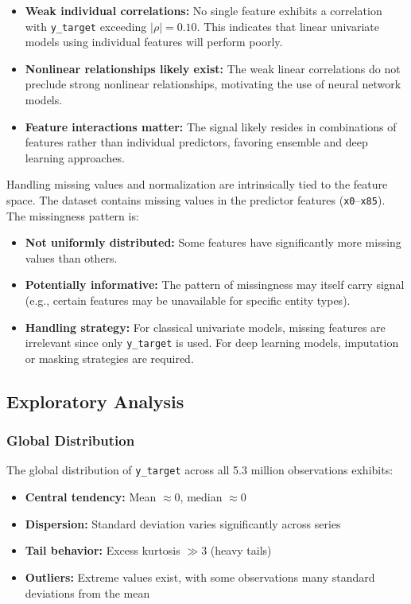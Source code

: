 \begin{itemize}
    \item \textbf{Weak individual correlations:} No single feature exhibits a correlation with \texttt{y\_target} exceeding $|\rho| = 0.10$. This indicates that linear univariate models using individual features will perform poorly.
    \item \textbf{Nonlinear relationships likely exist:} The weak linear correlations do not preclude strong nonlinear relationships, motivating the use of neural network models.
    \item \textbf{Feature interactions matter:} The signal likely resides in combinations of features rather than individual predictors, favoring ensemble and deep learning approaches.
\end{itemize}
Handling missing values and normalization are intrinsically tied to the feature space. The dataset contains missing values in the predictor features (\texttt{x0}--\texttt{x85}). The missingness pattern is:

\begin{itemize}
    \item \textbf{Not uniformly distributed:} Some features have significantly more missing values than others.
    \item \textbf{Potentially informative:} The pattern of missingness may itself carry signal (e.g., certain features may be unavailable for specific entity types).
    \item \textbf{Handling strategy:} For classical univariate models, missing features are irrelevant since only \texttt{y\_target} is used. For deep learning models, imputation or masking strategies are required.
\end{itemize}

\subsection{Exploratory Analysis}
\subsubsection{Global Distribution}

The global distribution of \texttt{y\_target} across all 5.3 million observations exhibits:

\begin{itemize}
    \item \textbf{Central tendency:} Mean $\approx 0$, median $\approx 0$
    \item \textbf{Dispersion:} Standard deviation varies significantly across series
    \item \textbf{Tail behavior:} Excess kurtosis $\gg 3$ (heavy tails)
    \item \textbf{Outliers:} Extreme values exist, with some observations many standard deviations from the mean
\end{itemize}

